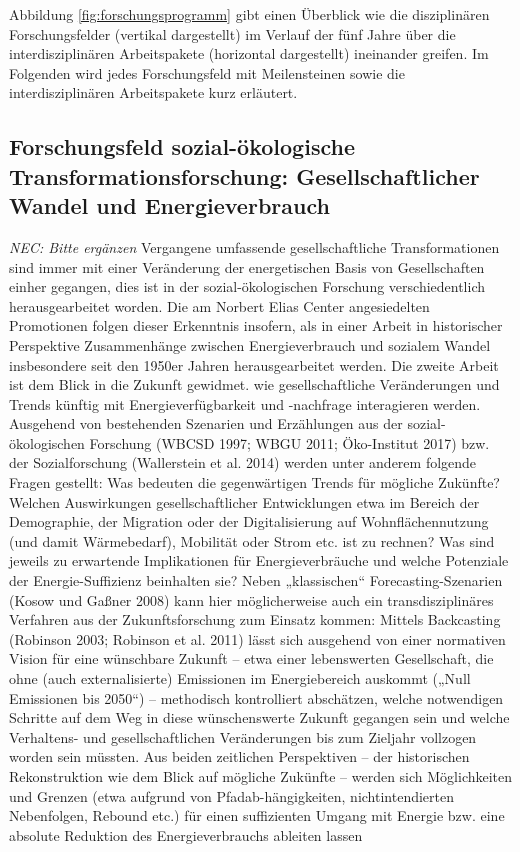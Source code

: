 \documentclass[a4paper,11pt,twoside]{scrartcl}
\begin{document}
Abbildung \ref{fig:forschungsprogramm} gibt einen Überblick wie die disziplinären Forschungsfelder (vertikal dargestellt) im Verlauf der fünf Jahre über die interdisziplinären Arbeitspakete (horizontal dargestellt) ineinander greifen. Im Folgenden wird jedes Forschungsfeld mit Meilensteinen sowie die interdisziplinären Arbeitspakete kurz erläutert.

\subsection*{Forschungsfeld sozial-ökologische Transformationsforschung: Gesellschaftlicher Wandel und Energieverbrauch}
\textit{NEC: Bitte ergänzen}
Vergangene umfassende gesellschaftliche Transformationen sind immer mit einer Veränderung der energetischen Basis von Gesellschaften einher gegangen, dies ist in der sozial-ökologischen Forschung verschiedentlich herausgearbeitet worden. Die am Norbert Elias Center angesiedelten Promotionen folgen dieser Erkenntnis insofern, als in einer Arbeit in historischer Perspektive Zusammenhänge zwischen Energieverbrauch und sozialem Wandel insbesondere seit den 1950er Jahren herausgearbeitet werden. Die zweite Arbeit ist dem Blick in die Zukunft gewidmet. wie gesellschaftliche Veränderungen und Trends künftig mit Energieverfügbarkeit und -nachfrage interagieren werden. Ausgehend von bestehenden Szenarien und Erzählungen aus der sozial-ökologischen Forschung (WBCSD 1997; WBGU 2011; Öko-Institut 2017) bzw. der Sozialforschung (Wallerstein et al. 2014) werden unter anderem folgende Fragen gestellt: Was bedeuten die gegenwärtigen Trends für mögliche Zukünfte? Welchen Auswirkungen gesellschaftlicher Entwicklungen etwa im Bereich der Demographie, der Migration oder der Digitalisierung auf Wohnflächennutzung (und damit Wärmebedarf), Mobilität oder Strom etc. ist zu rechnen? Was sind jeweils zu erwartende Implikationen für Energieverbräuche und welche Potenziale der Energie-Suffizienz beinhalten sie? Neben „klassischen“ Forecasting-Szenarien (Kosow und Gaßner 2008) kann hier möglicherweise auch ein transdisziplinäres Verfahren aus der Zukunftsforschung zum Einsatz kommen: Mittels Backcasting (Robinson 2003; Robinson et al. 2011) lässt sich ausgehend von einer normativen Vision für eine wünschbare Zukunft – etwa einer lebenswerten Gesellschaft, die ohne (auch externalisierte) Emissionen im Energiebereich auskommt („Null Emissionen bis 2050“) – methodisch kontrolliert abschätzen, welche notwendigen Schritte auf dem Weg in diese wünschenswerte Zukunft gegangen sein und welche Verhaltens- und gesellschaftlichen Veränderungen bis zum Zieljahr vollzogen worden sein müssten. 
Aus beiden zeitlichen Perspektiven – der historischen Rekonstruktion wie dem Blick auf mögliche Zukünfte – werden sich Möglichkeiten und Grenzen (etwa aufgrund von Pfadab-hängigkeiten, nichtintendierten Nebenfolgen, Rebound etc.) für einen suffizienten Umgang mit Energie bzw. eine absolute Reduktion des Energieverbrauchs ableiten lassen  
\end{document}
